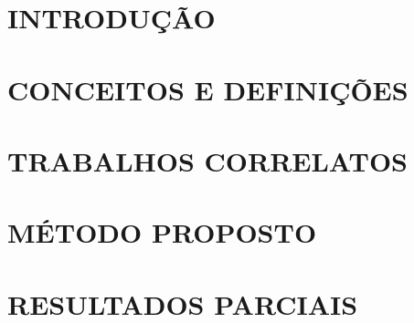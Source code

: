 \documentclass[
	12pt,				%
  oneside,
	a4paper,			%
	chapter=TITLE,		%
	english,			%
	brazil				%
	]{abntex2}
\begin{document}

\tableofcontents*
\cleardoublepage



\textual
\chapter{INTRODUÇÃO}


\chapter{CONCEITOS E DEFINIÇÕES}


\chapter{TRABALHOS CORRELATOS}


\chapter{MÉTODO PROPOSTO}



\chapter{RESULTADOS PARCIAIS}

\end{document}
